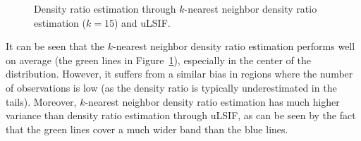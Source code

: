 \documentclass[
]{article}
\begin{document}
\linespread{1}

\begin{figure}[t]


\caption{\label{fig-AppB}Density ratio estimation through \(k\)-nearest
neighbor density ratio estimation (\(k = 15\)) and uLSIF.}

\end{figure}%

\linespread{2}

It can be seen that the \(k\)-nearest neighbor density ratio estimation
performs well on average (the green lines in Figure~\ref{fig-AppB}),
especially in the center of the distribution. However, it suffers from a
similar bias in regions where the number of observations is low (as the
density ratio is typically underestimated in the tails). Moreover,
\(k\)-nearest neighbor density ratio estimation has much higher variance
than density ratio estimation through uLSIF, as can be seen by the fact
that the green lines cover a much wider band than the blue lines.
\end{document}
